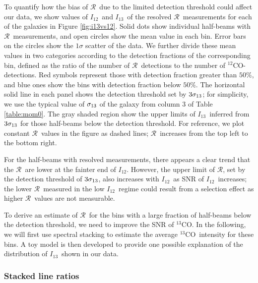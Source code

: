 \documentclass{emulateapj}
\def\ttco{\mbox{$^{13}$CO}}
\def\twco{\mbox{$^{12}$CO}}
\def\rtt{$\mathcal{R}$}
\def\itw{$I_{12}$}
\def\itt{$I_{13}$}
\begin{document}
To quantify how the bias of \rtt \  due to the limited detection threshold 
could affect our data, we show values of \itw \ and \itt \ of the resolved \rtt \  
measurements for each of the galaxies in Figure \ref{fig:i13vs12}.
Solid dots show individual half-beams with \rtt \ measurements,
and open circles show the mean value in each bin.
Error bars on the circles show the $1\sigma$  scatter of the data.
We further divide these mean values in two categories
according to the detection fractions of the corresponding bin,
defined as the ratio of the number of \rtt \ detections to the number of \twco-detections.
Red symbols represent those with detection fraction greater than $50\%$,
and blue ones show the bins with detection fraction below $50\%$.
The horizontal solid line in each panel shows
the detection threshold set by $3\sigma_{\rm 13}$;
for simplicity, we use the typical value of $\sigma_{\rm 13}$ of the galaxy from column 3 of Table \ref{table:mom0}. 
The gray shaded region show the upper limits of \itt \ inferred from $3\sigma_{\rm 13}$ for those half-beams below the detection threshold.
For reference, we plot constant \rtt \ values in the figure as dashed lines;
\rtt \  increases from the top left to the bottom right.

For the half-beams with resolved measurements,
there appears a clear trend that the \rtt \ are lower at the fainter end of \itw.
However, the upper limit of \rtt, set by the detection threshold  of $3\sigma_{\rm 13}$,
also increases with \itw \ as SNR of \itw \  increases; 
the lower \rtt \ measured in the low \itw \  regime could
result from a selection effect as higher \rtt \ values are not measurable. 

To derive an estimate of \rtt \ for the bins with a large fraction of 
half-beams below the detection threshold,  we need to improve the SNR of \ttco.  
In the following, we will first use spectral stacking to estimate
the average \ttco \ intensity for these bins.  
A toy model is then developed to provide one possible
explanation of the distribution of \itt \ shown in our data.



\subsubsection{Stacked line ratios}
\label{sec:stack}
\end{document}
